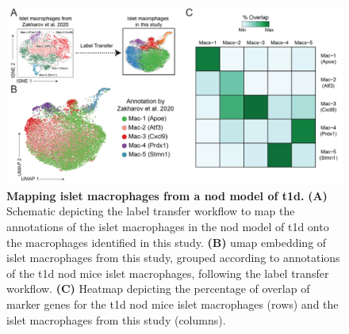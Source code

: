 \vspace{-20pt}
\begin{figure}[H]
\centering
\includegraphics[width=13cm]{Chapter4/Fig/F2-5-02.png}
\caption[Mapping islet macrophages from  model of ]{\textbf{Mapping islet macrophages from a \gls{nod} model of \gls{t1d}.} \textbf{(A)} Schematic depicting the label transfer workflow to map the annotations of the islet macrophages in the \gls{nod} model of \gls{t1d} onto the macrophages identified in this study. \textbf{(B)} \gls{umap} embedding of islet macrophages from this study, grouped according to annotations of the \gls{t1d} \gls{nod} mice islet macrophages, following the label transfer workflow. \textbf{(C)} Heatmap depicting the percentage of overlap of marker genes for the \gls{t1d} \gls{nod} mice islet macrophages (rows) and the islet macrophages from this study (columns).}
\label{fig:chp2_scrna_macrophages_unanue}
\end{figure}

